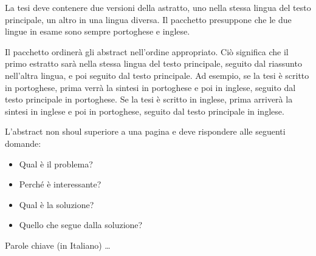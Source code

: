 La tesi deve contenere due versioni della astratto, uno nella stessa lingua del testo principale, un altro in una lingua diversa. Il pacchetto presuppone che le due lingue in esame sono sempre portoghese e inglese.

Il pacchetto ordinerà gli abstract nell'ordine appropriato. Ciò significa che il primo estratto sarà nella stessa lingua del testo principale, seguito dal riassunto nell'altra lingua, e poi seguito dal testo principale. Ad esempio, se la tesi è scritto in portoghese, prima verrà la sintesi in portoghese e poi in inglese, seguito dal testo principale in portoghese. Se la tesi è scritto in inglese, prima arriverà la sintesi in inglese e poi in portoghese, seguito dal testo principale in inglese.

L'abstract non shoul superiore a una pagina e deve rispondere alle seguenti domande:

\begin{itemize}
\item Qual è il problema?
\item Perché è interessante?
\item Qual è la soluzione?
\item Quello che segue dalla soluzione?
\end{itemize}

\begin{keywords}
Parole chiave (in Italiano) \ldots
\end{keywords} 
